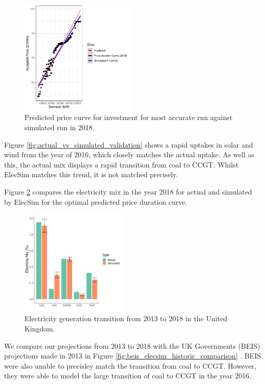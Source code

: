\documentclass[final,3p,times,twocolumn,numbers]{elsarticle}
\begin{document}
\begin{figure}
\centering
\includegraphics[width=0.49\textwidth]{figures/results/best_run_price_dur_curve.pdf}
\caption{Predicted price curve for investment for most accurate run against simulated run in 2018.}
\label{fig:best_price_curve}
\end{figure}


Figure \ref{fig:actual_vs_simulated_validation} shows a rapid uptakes in solar and wind from the year of 2016, which closely matches the actual uptake. As well as this, the actual mix displays a rapid transition from coal to CCGT. Whilst ElecSim matches this trend, it is not matched precisely. 

Figure \ref{fig:uk_validated_results_2018} compares the electricity mix in the year 2018 for actual and simulated by ElecSim for the optimal predicted price duration curve. 

\begin{figure}
\centering
\includegraphics[width=0.45\textwidth]{figures/results/best_run.pdf}
\caption{Electricity generation transition from 2013 to 2018 in the United Kingdom.}
\label{fig:uk_validated_results_2018}
\end{figure}


We compare our projections from 2013 to 2018 with the UK Governments (BEIS) projections made in 2013 in Figure \ref{fig:beis_elecsim_historic_comparison} \cite{UKDECC2013}. BEIS were also unable to precisley match the transition from coal to CCGT. However, they were able to model the large transition of coal to CCGT in the year 2016.
\end{document}
